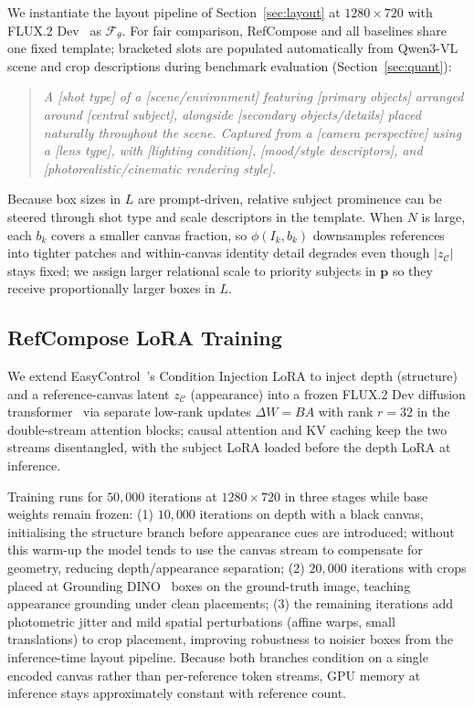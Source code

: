 We instantiate the layout pipeline of Section~\ref{sec:layout} at $1280 \times 720$ with FLUX.2 Dev~\cite{blackforestlabs2026flux2dev} as $\mathcal{F}_\theta$.
For fair comparison, RefCompose and all baselines share one fixed template; bracketed slots are populated automatically from Qwen3-VL~\cite{qwen3vl} scene and crop descriptions during benchmark evaluation (Section~\ref{sec:quant}):
\begin{quote}
\small
\textit{A [shot type] of a [scene/environment] featuring [primary objects] arranged around [central subject], alongside [secondary objects/details] placed naturally throughout the scene. Captured from a [camera perspective] using a [lens type], with [lighting condition], [mood/style descriptors], and [photorealistic/cinematic rendering style].}
\end{quote}

Because box sizes in $L$ are prompt-driven, relative subject prominence can be steered through shot type and scale descriptors in the template.
When $N$ is large, each $b_k$ covers a smaller canvas fraction, so $\phi(I_k, b_k)$ downsamples references into tighter patches and within-canvas identity detail degrades even though $|z_{\mathcal{C}}|$ stays fixed; we assign larger relational scale to priority subjects in $\mathbf{p}$ so they receive proportionally larger boxes in $L$.

\subsection{RefCompose LoRA Training}
We extend EasyControl~\cite{zhang2025easycontrol}'s Condition Injection LoRA to inject depth (structure) and a reference-canvas latent $z_{\mathcal{C}}$ (appearance) into a frozen FLUX.2 Dev diffusion transformer~\cite{blackforestlabs2026flux2dev} via separate low-rank updates $\Delta W = BA$ with rank $r{=}32$ in the double-stream attention blocks; causal attention and KV caching keep the two streams disentangled, with the subject LoRA loaded before the depth LoRA at inference.

Training runs for $50{,}000$ iterations at $1280 \times 720$ in three stages while base weights remain frozen: (1) $10{,}000$ iterations on depth with a black canvas, initialising the structure branch before appearance cues are introduced; without this warm-up the model tends to use the canvas stream to compensate for geometry, reducing depth/appearance separation; (2) $20{,}000$ iterations with crops placed at Grounding DINO~\cite{liu2023grounding} boxes on the ground-truth image, teaching appearance grounding under clean placements; (3) the remaining iterations add photometric jitter and mild spatial perturbations (affine warps, small translations) to crop placement, improving robustness to noisier boxes from the inference-time layout pipeline. Because both branches condition on a single encoded canvas rather than per-reference token streams, GPU memory at inference stays approximately constant with reference count.



